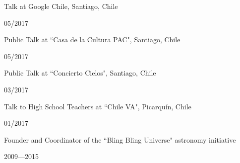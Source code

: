 \documentclass[11pt, a4paper]{article} %
\begin{document}
\begin{minipage}[t]{0.7\textwidth}
\begin{flushleft}%
  \setlength{\leftskip}{0.2cm}%
Talk at Google Chile, Santiago, Chile
\end{flushleft}
\end{minipage}
\begin{minipage}[t]{0.3\textwidth}
\hfill 05/2017
\end{minipage}

\begin{minipage}[t]{0.7\textwidth}
\begin{flushleft}%
  \setlength{\leftskip}{0.2cm}%
Public Talk at ``Casa de la Cultura PAC", Santiago, Chile
\end{flushleft}
\end{minipage}
\begin{minipage}[t]{0.3\textwidth}
\hfill 05/2017
\end{minipage}

\begin{minipage}[t]{0.7\textwidth}
\begin{flushleft}%
  \setlength{\leftskip}{0.2cm}%
Public Talk at ``Concierto Cielos", Santiago, Chile
\end{flushleft}
\end{minipage}
\begin{minipage}[t]{0.3\textwidth}
\hfill 03/2017
\end{minipage}

\begin{minipage}[t]{0.7\textwidth}
\begin{flushleft}%
  \setlength{\leftskip}{0.2cm}%
Talk to High School Teachers at ``Chile VA", Picarqu\'in, Chile
\end{flushleft}
\end{minipage}
\begin{minipage}[t]{0.3\textwidth}
\hfill 01/2017
\end{minipage}


\begin{minipage}[t]{0.8\textwidth}
\begin{flushleft}%
  \setlength{\leftskip}{0.2cm}%
Founder and Coordinator of the ``Bling Bling Universe" astronomy initiative
\end{flushleft}
\end{minipage}
\begin{minipage}[t]{0.2\textwidth}
\hfill 2009---2015
\end{minipage}
\end{document}
